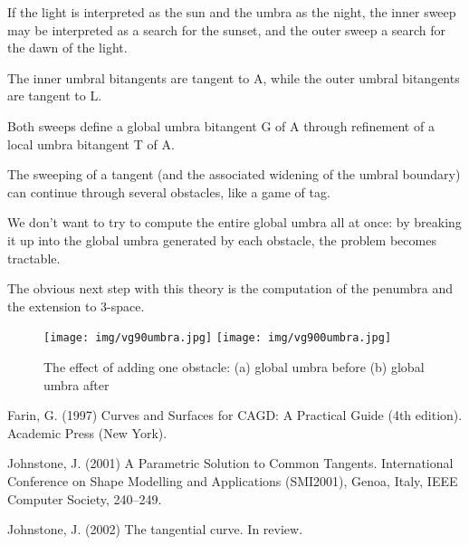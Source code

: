 \documentclass[9pt]{article}
\begin{document}
If the light is interpreted as the sun and the umbra as the night,
the inner sweep may be interpreted as a search for the sunset,
and the outer sweep a search for the dawn of the light.


The inner umbral bitangents are tangent to A,
while the outer umbral bitangents are tangent to L.

Both sweeps define a global umbra bitangent G of A
through refinement of a local umbra bitangent T of A.

The sweeping of a tangent (and the associated widening of the umbral boundary)
can continue through several obstacles, like a game of tag.

We don't want to try to compute the entire global umbra all at once:
by breaking it up into the global umbra generated by each obstacle,
the problem becomes tractable.

The obvious next step with this theory is the computation of the penumbra
and the extension to 3-space.

\begin{figure}
\begin{center}
\texttt{[image: img/vg90umbra.jpg]}
\texttt{[image: img/vg900umbra.jpg]}
\end{center}
\caption{The effect of adding one obstacle: (a) global umbra before (b) global umbra after}
\label{fig:scene2}
\end{figure}



% 
\begin{thebibliography}{99}

Farin, G. (1997)
Curves and Surfaces for CAGD: A Practical Guide (4th edition).
Academic Press (New York).

Johnstone, J. (2001)
A Parametric Solution to Common Tangents.
International Conference on Shape Modelling and Applications (SMI2001),
Genoa, Italy, IEEE Computer Society, 240--249.

Johnstone, J. (2002)
The tangential curve.
In review.

\end{thebibliography}
\end{document}
